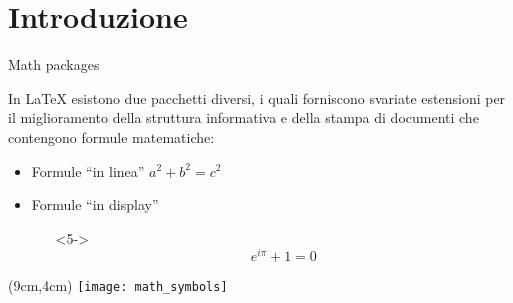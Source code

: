 \section{Introduzione}
  \begin{frame}{Math packages}

  In LaTeX esistono due pacchetti diversi, i quali forniscono svariate estensioni per il miglioramento della struttura informativa e della stampa di documenti che contengono formule matematiche:


    \begin{itemize}
      \item<4-> Formule ``in linea'' $a^2 + b^2 = c^2$
      \item<5-> Formule ``in display''
      \begin{itemize}
        \item[]<5-> \begin{equation} e^{i\pi}+1=0 \end{equation}
      \end{itemize}
    \end{itemize}
    
    \begin{textblock*}{5cm}(9cm,4cm)
      \texttt{[image: math\_symbols]}
    \end{textblock*}

\end{frame}
